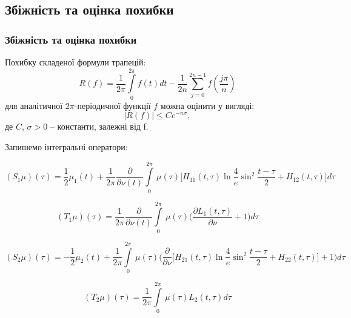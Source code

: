 \documentclass[10pt]{beamer}
\begin{document}
\subsection{Збіжність та оцінка похибки}
\begin{frame}
\frametitle{Збіжність та оцінка похибки}
Похибку складеної формули трапецій:
\begin{equation*}
R(f)=\frac{1}{2\pi}\int\limits_{0}^{2\pi}f(t)dt-\frac{1}{2n}\sum\limits_{j=0}^{2n-1}f(\frac{j\pi}{n})
\end{equation*}
для аналітичної $2\pi$-періодичної функції $f$ можна оцінити у вигляді:
\begin{equation*}
|R(f)|\le Ce^{-n\sigma},
\end{equation*}
де $C$, $\sigma>0$ -- константи, залежні від f. 
\end{frame}

\begin{frame}
Запишемо інтегральні оператори:

\begin{equation*}
(S_{1}\mu)(\tau)=\frac{1}{2}\mu_1(t) + \frac{1}{2\pi}\frac{\partial}{\partial\nu(t)}\int\limits_{0}^{2\pi} \,\mu(\tau)\Big[H_{11}(t,\tau)\ln{\frac{4}{e}\sin^2\frac{t-\tau}{2}}+H_{12}(t,\tau)\Big]d\tau
\end{equation*}

\begin{equation*}
(T_{1}\mu)(\tau)=\frac{1}{2\pi}\frac{\partial}{\partial\nu(t)}\int\limits_{0}^{2\pi} \,\mu(\tau)\bigg(\frac{\partial L_{1}(t,\tau)}{\partial \nu} + 1\bigg)d\tau
\end{equation*}

\begin{equation*}
(S_{2}\mu)(\tau)=-\frac{1}{2}\mu_2(t) + \frac{1}{2\pi}\int\limits_{0}^{2\pi} \,\mu(\tau)\bigg(\frac{\partial}{\partial\nu}\Big[H_{21}(t,\tau)\ln{\frac{4}{e}\sin^2\frac{t-\tau}{2}}+H_{22}(t,\tau)\Big] + 1\bigg)d\tau
\end{equation*}

\begin{equation*}
(T_{2}\mu)(\tau)=\frac{1}{2\pi}\int\limits_{0}^{2\pi} \,\mu(\tau)L_{2}(t,\tau)d\tau
\end{equation*}


\end{frame}
\end{document}
